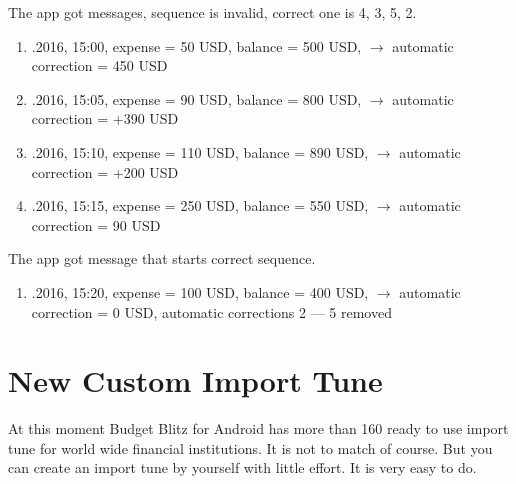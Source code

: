 \documentclass[a4paper,10pt,english]{sphinxmanual}
\begin{document}
\sphinxAtStartPar
The app got messages, sequence is invalid, correct one is 4, 3, 5, 2.
\begin{enumerate}
%
\setcounter{enumi}{1}
\item {} 
.2016, 15:00, expense = \sphinxhyphen{}50 USD, balance = 500 USD, \(\rightarrow\) automatic correction = \sphinxhyphen{}450 USD

\item {} 
.2016, 15:05, expense = \sphinxhyphen{}90 USD, balance = 800 USD, \(\rightarrow\) automatic correction = +390 USD

\item {} 
.2016, 15:10, expense = \sphinxhyphen{}110 USD, balance = 890 USD, \(\rightarrow\) automatic correction = +200 USD

\item {} 
.2016, 15:15, expense = \sphinxhyphen{}250 USD, balance = 550 USD, \(\rightarrow\) automatic correction = \sphinxhyphen{}90 USD

\end{enumerate}

\sphinxAtStartPar
The app got message that starts correct sequence.
\begin{enumerate}
%
\setcounter{enumi}{5}
\item {} 
.2016, 15:20, expense = \sphinxhyphen{}100 USD, balance = 400 USD, \(\rightarrow\) automatic correction  = 0 USD, automatic corrections  2 — 5 removed

\end{enumerate}


\section{New Custom Import Tune}
\label{\detokenize{notifications:new-custom-import-tune}}
\sphinxAtStartPar
At this moment Budget Blitz for Android has more than 160 ready to use import tune for world wide financial institutions.
It is not to match of course. But you can create an import tune by yourself with little effort.
It is very easy to do.

\noindent{}
\noindent{}
\noindent{}
\end{document}
